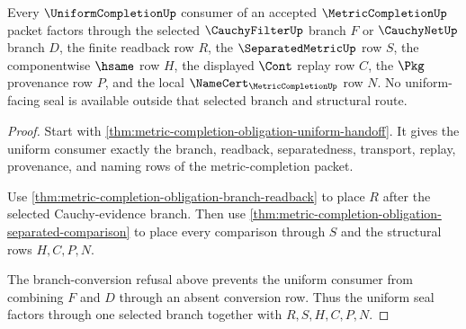 \begin{theorem}
\label{thm:metric-completion-uniform-seal-factorization}
Every $\UniformCompletionUp$ consumer of an accepted $\MetricCompletionUp$ packet factors through the selected $\CauchyFilterUp$ branch $F$ or $\CauchyNetUp$ branch $D$, the finite readback row $R$, the $\SeparatedMetricUp$ row $S$, the componentwise $\hsame$ row $H$, the displayed $\Cont$ replay row $C$, the $\Pkg$ provenance row $P$, and the local $\NameCert_{\MetricCompletionUp}$ row $N$. No uniform-facing seal is available outside that selected branch and structural route.
\end{theorem}
\begin{proof}
Start with \autoref{thm:metric-completion-obligation-uniform-handoff}. It gives the uniform consumer exactly the branch, readback, separatedness, transport, replay, provenance, and naming rows of the metric-completion packet.

Use \autoref{thm:metric-completion-obligation-branch-readback} to place $R$ after the selected Cauchy-evidence branch. Then use \autoref{thm:metric-completion-obligation-separated-comparison} to place every comparison through $S$ and the structural rows $H,C,P,N$.

The branch-conversion refusal above prevents the uniform consumer from combining $F$ and $D$ through an absent conversion row. Thus the uniform seal factors through one selected branch together with $R,S,H,C,P,N$.
\end{proof}

